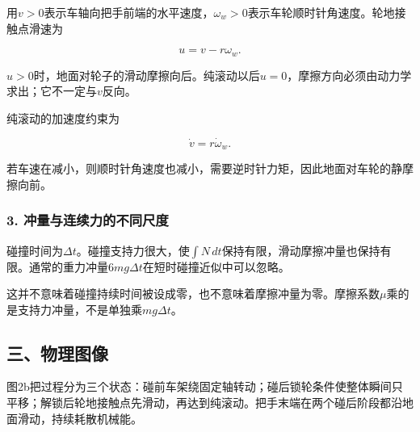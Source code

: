 \documentclass[12pt,a4paper,fontset=fandol]{ctexart}
\begin{document}
用\(v>0\)表示车轴向把手前端的水平速度，\(\omega_w>0\)表示车轮顺时针角速度。轮地接触点滑速为

\[
u=v-r\omega_w.
\]

\(u>0\)时，地面对轮子的滑动摩擦向后。纯滚动以后\(u=0\)，摩擦方向必须由动力学求出；它不一定与\(v\)反向。

纯滚动的加速度约束为

\[
\dot v=r\dot\omega_w.
\]

若车速在减小，则顺时针角速度也减小，需要逆时针力矩，因此地面对车轮的静摩擦向前。

\subsubsection{3.
冲量与连续力的不同尺度}\label{ux51b2ux91cfux4e0eux8fdeux7eedux529bux7684ux4e0dux540cux5c3aux5ea6}

碰撞时间为\(\Delta t\)。碰撞支持力很大，使\(\int N\,dt\)保持有限，滑动摩擦冲量也保持有限。通常的重力冲量\(6mg\Delta t\)在短时碰撞近似中可以忽略。

这并不意味着碰撞持续时间被设成零，也不意味着摩擦冲量为零。摩擦系数\(\mu\)乘的是支持力冲量，不是单独乘\(mg\Delta t\)。

\subsection{三、物理图像}\label{ux4e09ux7269ux7406ux56feux50cf-1}

图2b把过程分为三个状态：碰前车架绕固定轴转动；碰后锁轮条件使整体瞬间只平移；解锁后轮地接触点先滑动，再达到纯滚动。把手末端在两个碰后阶段都沿地面滑动，持续耗散机械能。

\begin{center}
\begin{minipage}{\linewidth}
\centering\begingroup{}
\ifdim\wd\diagrambox>.88\linewidth
\sbox{\diagrambox}{\resizebox{.88\linewidth}{!}{\usebox{\diagrambox}}}\fi
\ifdim\ht\diagrambox>.38\textheight
\resizebox{!}{.38\textheight}{\usebox{\diagrambox}}
\else\usebox{\diagrambox}\fi
\par{}\endgroup\end{minipage}\end{center}
\end{document}
